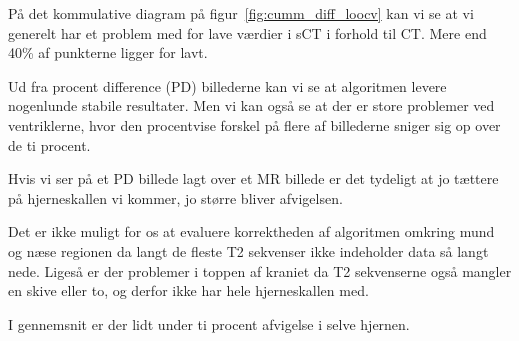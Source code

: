 På det kommulative diagram på figur~\ref{fig:cumm_diff_loocv} kan vi se at vi generelt har et problem med for lave værdier i sCT i forhold til CT. Mere end 40\% af punkterne ligger for lavt.

Ud fra procent difference (PD) billederne kan vi se at algoritmen levere nogenlunde stabile resultater. Men vi kan også se at der er store problemer ved ventriklerne, hvor den procentvise forskel på flere af billederne sniger sig op over de ti procent.

Hvis vi ser på et PD billede lagt over et MR billede er det tydeligt at jo tættere på hjerneskallen vi kommer, jo større bliver afvigelsen.

Det er ikke muligt for os at evaluere korrektheden af algoritmen omkring mund og næse regionen da langt de fleste T2 sekvenser ikke indeholder data så langt nede. Ligeså er der problemer i toppen af kraniet da T2 sekvenserne også mangler en skive eller to, og derfor ikke har hele hjerneskallen med.

I gennemsnit er der lidt under ti procent afvigelse i selve hjernen.

